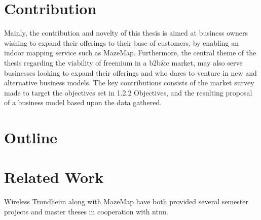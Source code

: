 \section{Contribution}
Mainly, the contribution and novelty of this thesis is aimed at business owners wishing to expand their offerings to their base of customers, by enabling an indoor mapping service such as MazeMap. Furthermore, the central theme of the thesis regarding the viability of freemium in a \gls{b2b&c} market, may also serve businesses looking to expand their offerings and who dares to venture in new and alternative business models. The key contributions consists of the market survey made to target the objectives set in 1.2.2 Objectives, and the resulting proposal of a business model based upon the data gathered.   
\section{Outline}

\section{Related Work}
Wireless Trondheim along with MazeMap have both provided several semester projects and master theses in cooperation with \gls{ntnu}.